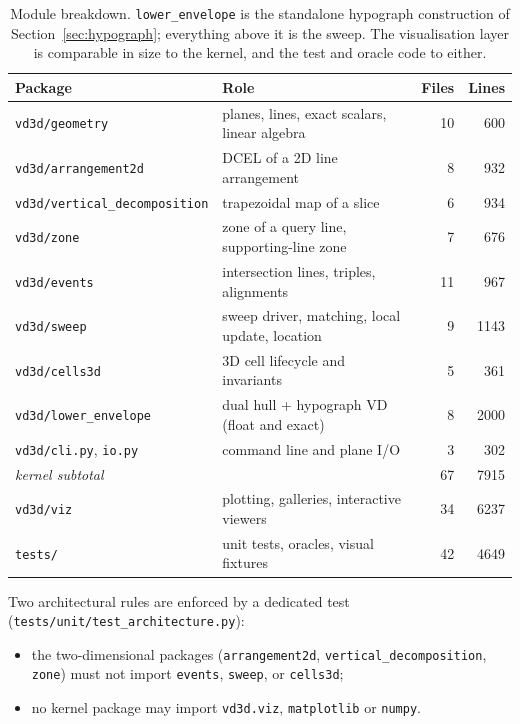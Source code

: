 \documentclass[11pt]{article}
\begin{document}
\begin{table}[htbp]
\centering
\begin{tabular}{llrr}
\toprule
Package & Role & Files & Lines \\
\midrule
\texttt{vd3d/geometry}               & planes, lines, exact scalars, linear algebra & 10 & 600 \\
\texttt{vd3d/arrangement2d}          & DCEL of a 2D line arrangement                 & 8  & 932 \\
\texttt{vd3d/vertical\_decomposition}& trapezoidal map of a slice                    & 6  & 934 \\
\texttt{vd3d/zone}                   & zone of a query line, supporting-line zone    & 7  & 676 \\
\texttt{vd3d/events}                 & intersection lines, triples, alignments       & 11 & 967 \\
\texttt{vd3d/sweep}                  & sweep driver, matching, local update, location& 9  & 1143 \\
\texttt{vd3d/cells3d}                & 3D cell lifecycle and invariants              & 5  & 361 \\
\texttt{vd3d/lower\_envelope}        & dual hull + hypograph VD (float and exact)    & 8  & 2000 \\
\texttt{vd3d/cli.py}, \texttt{io.py} & command line and plane I/O                    & 3  & 302 \\
\midrule
\multicolumn{2}{l}{\emph{kernel subtotal}}                                           & 67 & 7915 \\
\texttt{vd3d/viz}                    & plotting, galleries, interactive viewers      & 34 & 6237 \\
\texttt{tests/}                      & unit tests, oracles, visual fixtures          & 42 & 4649 \\
\bottomrule
\end{tabular}
\caption{Module breakdown.  \texttt{lower\_envelope} is the standalone
hypograph construction of Section~\ref{sec:hypograph}; everything above it is
the sweep.  The visualisation layer is comparable in size to the kernel, and
the test and oracle code to either.}
\label{tab:loc}
\end{table}

Two architectural rules are enforced by a dedicated test
(\texttt{tests/unit/test\_architecture.py}):

\begin{itemize}
\item the two-dimensional packages (\texttt{arrangement2d},
  \texttt{vertical\_decomposition}, \texttt{zone}) must not import
  \texttt{events}, \texttt{sweep}, or \texttt{cells3d};
\item no kernel package may import \texttt{vd3d.viz}, \texttt{matplotlib} or
  \texttt{numpy}.
\end{itemize}
\end{document}
